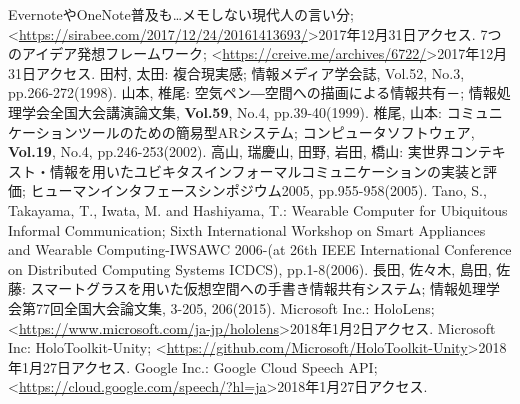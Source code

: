 \documentclass[technicalreport]{ieicej}
\begin{document}
%
%
\begin{thebibliography}{数字}%
   EvernoteやOneNote普及も…メモしない現代人の言い分; \textless\url{https://sirabee.com/2017/12/24/20161413693/}\textgreater2017年12月31日アクセス.
   7つのアイデア発想フレームワーク; \textless\url{https://creive.me/archives/6722/}\textgreater2017年12月31日アクセス.
   田村, 太田: 複合現実感; 情報メディア学会誌, Vol.52, No.3, pp.266-272(1998).
   山本, 椎尾: 空気ペン―空間への描画による情報共有－; 情報処理学会全国大会講演論文集, {\bf Vol.59}, No.4, pp.39-40(1999).
   椎尾, 山本: コミュニケーションツールのための簡易型ARシステム; コンピュータソフトウェア, {\bf Vol.19}, No.4, pp.246-253(2002).
   高山, 瑞慶山, 田野, 岩田, 橋山: 実世界コンテキスト・情報を用いたユビキタスインフォーマルコミュニケーションの実装と評価; ヒューマンインタフェースシンポジウム2005, pp.955-958(2005).
   Tano, S., Takayama, T., Iwata, M. and Hashiyama, T.: Wearable Computer for Ubiquitous Informal Communication; Sixth International Workshop on Smart Appliances and Wearable Computing-IWSAWC 2006-(at 26th IEEE International Conference on Distributed Computing Systems ICDCS), pp.1-8(2006).
   長田, 佐々木, 島田, 佐藤: スマートグラスを用いた仮想空間への手書き情報共有システム; 情報処理学会第77回全国大会論文集, 3-205, 206(2015).
   Microsoft Inc.: HoloLens; \textless\url{https://www.microsoft.com/ja-jp/hololens}\textgreater2018年1月2日アクセス.
   Microsoft Inc: HoloToolkit-Unity; \textless\url{https://github.com/Microsoft/HoloToolkit-Unity}\textgreater2018年1月27日アクセス.
   Google Inc.: Google Cloud Speech API; \textless\url{https://cloud.google.com/speech/?hl=ja}\textgreater2018年1月27日アクセス.
\end{thebibliography}
\end{document}

